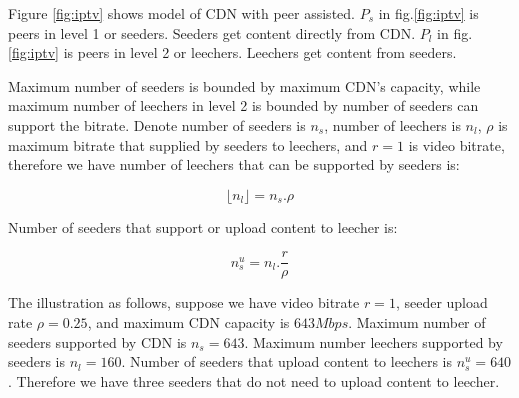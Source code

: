 \documentclass[conference]{IEEEtran}
\begin{document}
Figure \ref{fig:iptv} shows model of CDN with peer assisted.  
$P_s$ in fig.\ref{fig:iptv} is peers in level 1 or seeders.  
Seeders get content directly from CDN.  
$P_l$ in fig.\ref{fig:iptv} is peers in level 2 or leechers.
Leechers get content from seeders.

Maximum number of seeders is bounded by maximum CDN's capacity, while maximum number of leechers in level 2 is bounded by number of seeders can support the bitrate.
Denote number of seeders is $n_s$, number of leechers is $n_l$, $\rho$ is maximum bitrate that supplied by seeders to leechers, and $r=1$ is video bitrate, therefore we have number of leechers that can be supported by seeders is:

\begin{equation}\label{eqn:leecher}
	\lfloor n_l \rfloor = n_s . \rho
\end{equation}

Number of seeders that support or upload content to leecher is:

\begin{equation}\label{eqn:seeders-to-leechers}
	n_{s}^{u} = n_l . \frac{r}{\rho}
\end{equation}

The illustration as follows, suppose we have video bitrate $r=1$, seeder upload rate $\rho=0.25$, and maximum CDN capacity is $643Mbps$. 
Maximum number of seeders supported by CDN is $n_s=643$.
Maximum number leechers supported by seeders is $n_l=160$.  
Number of seeders that upload content to leechers is $n_{s}^{u}=640$.  
Therefore we have three seeders that do not need to upload content to leecher. 
\end{document}
